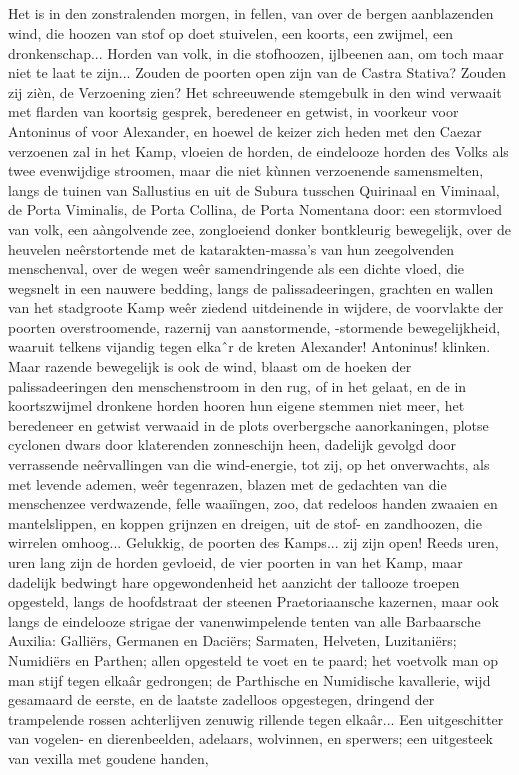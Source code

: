 \documentclass[a4paper, 12pt, oneside, dutch]{article}
\begin{document}
\subsection{}
\paragraph{}
Het is in den zonstralenden morgen, in fellen, van over de bergen aanblazenden wind, die hoozen van stof op doet stuivelen, een koorts, een zwijmel, een dronkenschap... Horden van volk, in die stofhoozen, ijlbeenen aan, om toch maar niet te laat te zijn... Zouden de poorten open zijn van de Castra Stativa? Zouden zij zièn, de Verzoening zien? Het schreeuwende stemgebulk in den wind verwaait met flarden van koortsig gesprek, beredeneer en getwist, in voorkeur voor Antoninus of voor Alexander, en hoewel de keizer zich heden met den Caezar verzoenen zal in het Kamp, vloeien de horden, de eindelooze horden des Volks als twee evenwijdige stroomen, maar die niet kùnnen verzoenende samensmelten, langs de tuinen van Sallustius en uit de Subura tusschen Quirinaal en Viminaal, de Porta Viminalis, de Porta Collina, de Porta Nomentana door: een stormvloed van volk, een aàngolvende zee, zongloeiend donker bontkleurig bewegelijk, over de heuvelen neêrstortende met de katarakten-massa's van hun zeegolvenden menschenval, over de wegen weêr samendringende als een dichte vloed, die wegsnelt in een nauwere bedding, langs de palissadeeringen, grachten en wallen van het stadgroote Kamp weêr ziedend uitdeinende in wijdere, de voorvlakte der poorten overstroomende, razernij van aanstormende, -stormende bewegelijkheid, waaruit telkens vijandig tegen elkaˆr de kreten Alexander! Antoninus! klinken. Maar razende bewegelijk is ook de wind, blaast om de hoeken der palissadeeringen den menschenstroom in den rug, of in het gelaat, en de in koortszwijmel dronkene horden hooren hun eigene stemmen niet meer, het beredeneer en getwist verwaaid in de plots overbergsche aanorkaningen, plotse cyclonen dwars door klaterenden zonneschijn heen, dadelijk gevolgd door verrassende neêrvallingen van die wind-energie, tot zij, op het onverwachts, als met levende ademen, weêr tegenrazen, blazen met de gedachten van die menschenzee verdwazende, felle waaiïngen, zoo, dat redeloos handen zwaaien en mantelslippen, en koppen grijnzen en dreigen, uit de stof- en zandhoozen, die wirrelen omhoog... Gelukkig, de poorten des Kamps... zij zijn open! Reeds uren, uren lang zijn de horden gevloeid, de vier poorten in van het Kamp, maar dadelijk bedwingt hare opgewondenheid het aanzicht der tallooze troepen opgesteld, langs de hoofdstraat der steenen Praetoriaansche kazernen, maar ook langs de eindelooze strigae der vanenwimpelende tenten van alle Barbaarsche Auxilia: Galliërs, Germanen en Daciërs; Sarmaten, Helveten, Luzitaniërs; Numidiërs en Parthen; allen opgesteld te voet en te paard; het voetvolk man op man stijf tegen elkaâr gedrongen; de Parthische en Numidische kavallerie, wijd gesamaard de eerste, en de laatste zadelloos opgestegen, dringend der trampelende rossen achterlijven zenuwig rillende tegen elkaâr... Een uitgeschitter van vogelen- en dierenbeelden, adelaars, wolvinnen, en sperwers; een uitgesteek van vexilla met goudene handen, 
\end{document}
